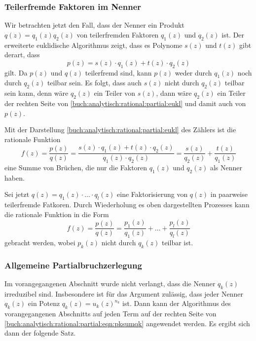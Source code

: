 \subsubsection{Teilerfremde Faktoren im Nenner}
Wir betrachten jetzt den Fall, dass der Nenner ein Produkt
$q(z) = q_1(z)q_2(z)$ von teilerfremden Faktoren $q_1(z)$ und $q_2(z)$
ist.
Der erweiterte euklidische Algorithmus zeigt, dass es Polynome
%
$s(z)$ und $t(z)$ gibt derart, dass
\begin{equation}
p(z)
=
s(z)\cdot q_1(z) + t(z)\cdot q_2(z)
\label{buch:analytisch:rational:partial:eukl}
\end{equation}
gilt.
Da $p(z)$ und $q(z)$ teilerfremd sind, kann $p(z)$ weder durch
$q_1(z)$ noch durch $q_2(z)$ teilbar sein.
Es folgt, dass auch
$s(z)$ nicht durch $q_2(z)$ teilbar sein kann, denn wäre $q_2(z)$
ein Teiler von $s(z)$, dann wäre $q_2(z)$ ein Teiler der rechten
Seite von
\eqref{buch:analytisch:rational:partial:eukl}
und damit auch von $p(z)$.

Mit der Darstellung
\eqref{buch:analytisch:rational:partial:eukl}
des Zählers ist die rationale Funktion
\[
f(z)
=
\frac{p(z)}{q(z)}
=
\frac{
s(z)\cdot q_1(z) + t(z)\cdot q_2(z)
}{q_1(z)\cdot q_2(z)}
=
\frac{s(z)}{q_2(z)}
+
\frac{t(z)}{q_1(z)}
\]
eine Summe von Brüchen, die nur die Faktoren $q_1(z)$ und $q_2(z)$
als Nenner haben.

Sei jetzt $q(z)=q_1(z)\cdot \ldots \cdot q_l(z)$ eine Faktorisierung
von $q(z)$ in paarweise teilerfremde Fatkoren.
Durch Wiederholung es oben dargestellten Prozesses kann die rationale
Funktion in die Form
\begin{equation}
f(z)
=
\frac{p(z)}{q(z)}
=
\frac{p_1(z)}{q_1(z)}
+
\ldots
+
\frac{p_l(z)}{q_l(z)}
\label{buch:analytisch:rational:partial:eqn:pksumqk}
\end{equation}
gebracht werden, wobei $p_k(z)$ nicht durch $q_k(z)$ teilbar ist.

%
%
\subsubsection{Allgemeine Partialbruchzerlegung}
Im vorangegangenen Abschnitt wurde nicht verlangt, dass die Nenner
$q_k(z)$ irreduzibel sind.
Insbesondere ist für das Argument zulässig, dass jeder Nenner $q_k(z)$
ein Potenz $q_k(z) = u_k(z)^{n_k}$ ist.
Dann kann der Algorithmus des vorangegangenen Abschnitts auf jeden
Term auf der rechten Seite von
\eqref{buch:analytisch:rational:partial:eqn:pksumqk}
angewendet werden.
Es ergibt sich dann der folgende Satz.

